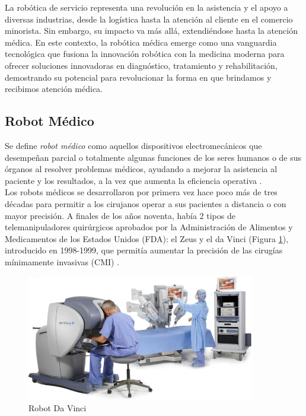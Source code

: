 La robótica de servicio representa una revolución en la asistencia y el apoyo a diversas industrias, desde la logística hasta la atención al cliente en el comercio minorista. Sin embargo, su impacto va más allá, extendiéndose hasta la atención médica. En este contexto, la robótica médica emerge como una vanguardia tecnológica que fusiona la innovación robótica con la medicina moderna para ofrecer soluciones innovadoras en diagnóstico, tratamiento y rehabilitación, demostrando su potencial para revolucionar la forma en que brindamos y recibimos atención médica.
\pagebreak
 
\subsection{Robot Médico}
\label{sec:robotica_industrial} 

Se define \textit{robot médico} como aquellos dispositivos electromecánicos que desempeñan parcial o totalmente algunas funciones de los seres humanos o de sus órganos al resolver problemas médicos, ayudando a mejorar la asistencia al paciente y los resultados, a la vez que aumenta la eficiencia operativa \cite{Kraevsky10}.\\

Los robots médicos se desarrollaron por primera vez hace poco más de tres décadas para permitir a los cirujanos operar a sus pacientes a distancia o con mayor precisión. A finales de los años noventa, había 2 tipos de telemanipuladores quirúrgicos aprobados por la Administración de Alimentos y Medicamentos de los Estados Unidos (FDA): el Zeus y el da Vinci (Figura \ref{fig:RobotDaVinci}), introducido en 1998-1999, que permitía aumentar la precisión de las cirugías mínimamente invasivas (CMI) \cite{Romero20}.\\

\begin{figure} [H]
    \begin{center}
      \includegraphics[width=10cm]{figs/Robot Da Vinci.png}
    \end{center}
    \caption{Robot Da Vinci}
    \label{fig:RobotDaVinci}
\end{figure}

